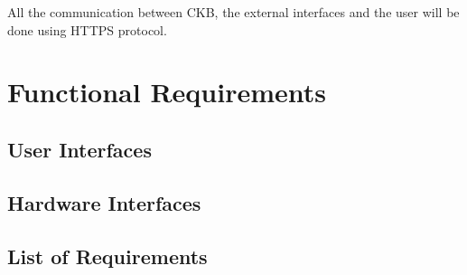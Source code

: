 All the communication between CKB, the external interfaces and the user will be done using HTTPS protocol.

\section{Functional Requirements}
\label{s:Functional_requirements}%

\subsection{User Interfaces}
\label{ss:User_interfaces}%

\subsection{Hardware Interfaces}
\label{ss:Hardware_interfaces}%

\subsection{List of Requirements}
\label{ss:List_of_Requirements}%


